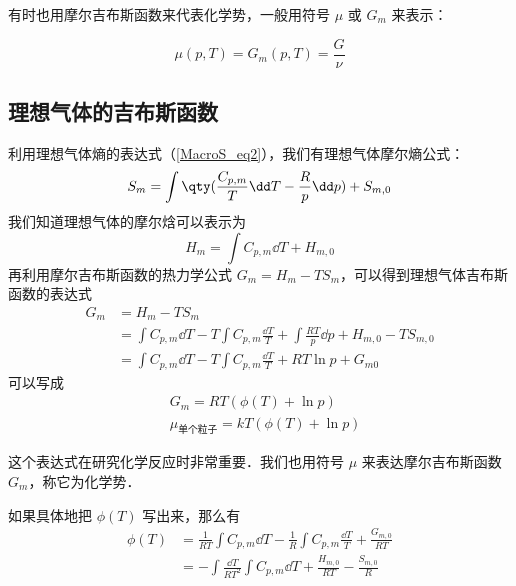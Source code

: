 有时也用摩尔吉布斯函数来代表化学势，一般用符号 $\mu$ 或 $G_m$ 来表示：

\begin{equation}\label{GibbsG_eq1}
\mu(p,T)=G_m(p,T)=\frac{G}{\nu}
\end{equation}

\subsection{理想气体的吉布斯函数}
利用理想气体熵的表达式（\autoref{MacroS_eq2}），我们有理想气体摩尔熵公式：
\begin{equation}
S_m=\int \qty(\frac{C_{p,m}}{T}\dd T-\frac{R}{p}\dd p)+S_{m,0}
\end{equation}
我们知道理想气体的摩尔焓可以表示为
\begin{equation}
H_m=\int C_{p,m}\dd T+H_{m,0}
\end{equation}
再利用摩尔吉布斯函数的热力学公式 $G_m=H_m-TS_m$，可以得到理想气体吉布斯函数的表达式
\begin{equation}
\begin{aligned}
G_m&=H_m-TS_m\\
&=\int C_{p,m} \dd T - T\int C_{p,m} \frac{\dd T}{T}+\int \frac{RT}{p}\dd p +H_{m,0}-TS_{m,0}
\\
&=\int C_{p,m} \dd T - T\int C_{p,m} \frac{\dd T}{T}+RT\ln p+G_{m0}
\end{aligned}
\end{equation}
可以写成
\begin{equation}\label{GibbsG_eq3}
\begin{aligned}
&G_m=RT(\phi(T)+\ln p)\\
&\mu_{\text{单个粒子}} = kT(\phi(T)+\ln p)
\end{aligned}
\end{equation}

这个表达式在研究化学反应时非常重要．我们也用符号 $\mu$ 来表达摩尔吉布斯函数 $G_m$，称它为化学势．

如果具体地把 $\phi(T)$ 写出来，那么有
\begin{equation}\label{GibbsG_eq4}
\begin{aligned}
\phi(T)&=\frac{1}{RT}\int C_{p,m}\dd T-\frac{1}{R}\int C_{p,m}\frac{\dd T}{T}+\frac{G_{m,0}}{RT}\\
&=-\int \frac{\dd T}{RT^2}\int C_{p,m}\dd T+\frac{H_{m,0}}{RT}-\frac{S_{m,0}}{R}
\end{aligned}
\end{equation}

